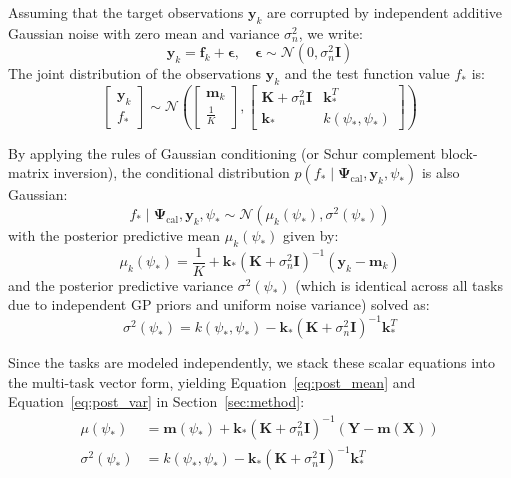 \documentclass{article}
\theoremstyle{plain}
\theoremstyle{definition}
\theoremstyle{remark}
\begin{document}
Assuming that the target observations $\mathbf{y}_k$ are corrupted by independent additive Gaussian noise with zero mean and variance $\sigma_n^2$, we write:
\begin{equation}
\mathbf{y}_k = \mathbf{f}_k + \boldsymbol{\epsilon}, \quad \boldsymbol{\epsilon} \sim \mathcal{N}(0, \sigma_n^2 \mathbf{I})
\end{equation}
The joint distribution of the observations $\mathbf{y}_k$ and the test function value $f_*$ is:
\begin{equation}
\begin{bmatrix} \mathbf{y}_k \\ f_* \end{bmatrix} \sim \mathcal{N}\left( \begin{bmatrix} \mathbf{m}_k \\ \frac{1}{K} \end{bmatrix}, \begin{bmatrix} \mathbf{K} + \sigma_n^2 \mathbf{I} & \mathbf{k}_*^T \\ \mathbf{k}_* & k(\psi_*, \psi_*) \end{bmatrix} \right)
\end{equation}

By applying the rules of Gaussian conditioning (or Schur complement block-matrix inversion), the conditional distribution $p(f_* \mid \mathbf{\Psi}_{\text{cal}}, \mathbf{y}_k, \psi_*)$ is also Gaussian:
\begin{equation}
f_* \mid \mathbf{\Psi}_{\text{cal}}, \mathbf{y}_k, \psi_* \sim \mathcal{N}(\mu_k(\psi_*), \sigma^2(\psi_*))
\end{equation}
with the posterior predictive mean $\mu_k(\psi_*)$ given by:
\begin{equation}
\mu_k(\psi_*) = \frac{1}{K} + \mathbf{k}_* \left( \mathbf{K} + \sigma_n^2 \mathbf{I} \right)^{-1} \left( \mathbf{y}_k - \mathbf{m}_k \right)
\end{equation}
and the posterior predictive variance $\sigma^2(\psi_*)$ (which is identical across all tasks due to independent GP priors and uniform noise variance) solved as:
\begin{equation}
\sigma^2(\psi_*) = k(\psi_*, \psi_*) - \mathbf{k}_* \left( \mathbf{K} + \sigma_n^2 \mathbf{I} \right)^{-1} \mathbf{k}_*^T
\end{equation}

Since the tasks are modeled independently, we stack these scalar equations into the multi-task vector form, yielding Equation~\ref{eq:post_mean} and Equation~\ref{eq:post_var} in Section~\ref{sec:method}:
\begin{align}
\mu(\psi_*) &= \mathbf{m}(\psi_*) + \mathbf{k}_* \left( \mathbf{K} + \sigma_n^2 \mathbf{I} \right)^{-1} \left( \mathbf{Y} - \mathbf{m}(\mathbf{X}) \right) \\
\sigma^2(\psi_*) &= k(\psi_*, \psi_*) - \mathbf{k}_* \left( \mathbf{K} + \sigma_n^2 \mathbf{I} \right)^{-1} \mathbf{k}_*^T
\end{align}
\end{document}
